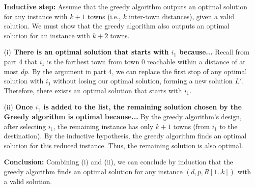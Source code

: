 \documentclass[11pt,fleqn]{exam}
\newenvironment{soln}{\color{solnblue}}{}
\begin{document}
\begin{questions}
\begin{soln}
   \vspace{0.2cm}
   \noindent
   \textbf{Inductive step:}  
   Assume that the greedy algorithm outputs an optimal solution for any 
   instance with \( k+1 \) towns (i.e., \( k \) inter-town distances), 
   given a valid solution. We must show that the greedy algorithm also
    outputs an optimal solution for an instance with \( k+2 \) towns.
   
   \vspace{0.2cm}
   (i) \textbf{There is an optimal solution that starts with \( i_1 \) because...}  
   Recall from part 4 that \( i_1 \) is the farthest town from town \( 0 \) 
   reachable within a distance of at most \( dp \). By the argument in part 4, 
   we can replace the first stop of any optimal solution with \( i_1 \) without 
   losing our optimal solution, 
   forming a new solution \( L' \). Therefore, 
   there exists an optimal solution that starts with \( i_1 \).
   
   \vspace{0.2cm}
   (ii) \textbf{Once \( i_1 \) is added to the list, the remaining solution chosen 
   by the Greedy algorithm is optimal because...}  
   By the greedy algorithm's design, after selecting \( i_1 \), the remaining 
   instance has only \( k+1 \) towns (from \( i_1 \) to the destination). By the 
   inductive hypothesis, the greedy algorithm finds an optimal solution for this
    reduced instance. Thus, the remaining solution is also optimal.
   
   \vspace{0.2cm}
   \noindent
   \textbf{Conclusion:}  
   Combining (i) and (ii), we can conclude by induction that the greedy algorithm finds an 
   optimal solution for any instance \((d, p, R[1..k])\) with a valid solution.
\end{soln}
   

\end{questions}
\end{document}
